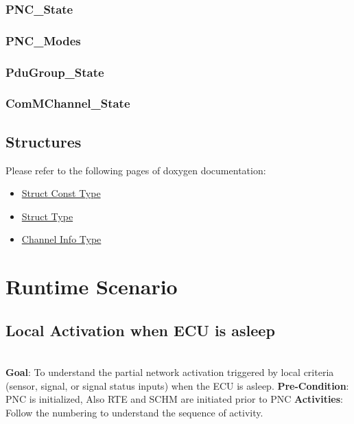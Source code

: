 \subsubsection{PNC_State}


	

{ }

\subsubsection{PNC_Modes} 

{ }

\subsubsection{PduGroup_State}

{}

\subsubsection{ComMChannel_State}

{}

\subsection{Structures}
Please refer to the following pages of doxygen documentation:

\begin{itemize}
	\item \href{./doxygen/html/struct_p_n_c___struct___const_type.html}{Struct Const Type}
	\item \href{./doxygen/html/struct_p_n_c___struct_type.html}{Struct Type}
	\item \href{/doxygen/html/struct_p_n_c___channel_info___type.html}{Channel Info Type}
\end{itemize}

\section{Runtime Scenario}

\subsection{Local Activation when ECU is asleep}
\\
\textbf{Goal}: To understand the partial network activation triggered by local criteria (sensor, signal, or signal status inputs) when the ECU is asleep.\newline
\textbf{Pre-Condition}: PNC is initialized, Also RTE and SCHM are initiated prior to PNC\newline 
\textbf{Activities}: Follow the numbering to understand the sequence of activity.

